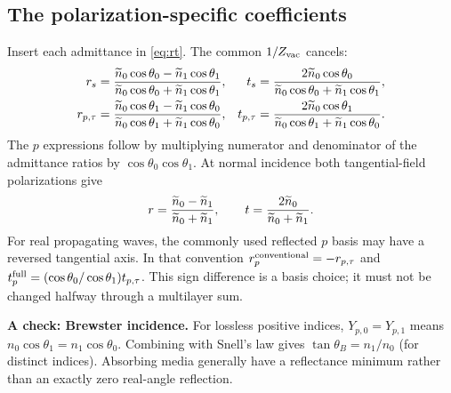 \subsection{The polarization-specific coefficients}
Insert each admittance in \eqref{eq:rt}. The common $1/Z_{\rm vac}$ cancels:
\begin{align}
r_s&=\frac{\widetilde n_0\cos\theta_0-\widetilde n_1\cos\theta_1}
{\widetilde n_0\cos\theta_0+\widetilde n_1\cos\theta_1},&
t_s&=\frac{2\widetilde n_0\cos\theta_0}
{\widetilde n_0\cos\theta_0+\widetilde n_1\cos\theta_1},\\
r_{p,\tau}&=\frac{\widetilde n_0\cos\theta_1-\widetilde n_1\cos\theta_0}
{\widetilde n_0\cos\theta_1+\widetilde n_1\cos\theta_0},&
t_{p,\tau}&=\frac{2\widetilde n_0\cos\theta_1}
{\widetilde n_0\cos\theta_1+\widetilde n_1\cos\theta_0}.
\end{align}
The $p$ expressions follow by multiplying numerator and denominator of the admittance ratios by $\cos\theta_0\cos\theta_1$. At normal incidence both tangential-field polarizations give
\begin{equation}
r=\frac{\widetilde n_0-\widetilde n_1}{\widetilde n_0+\widetilde n_1},\qquad
 t=\frac{2\widetilde n_0}{\widetilde n_0+\widetilde n_1}.
\end{equation}
For real propagating waves, the commonly used reflected $p$ basis may have a reversed tangential axis. In that convention $r_p^{\rm conventional}=-r_{p,\tau}$ and
$t_p^{\rm full}=(\cos\theta_0/\cos\theta_1)t_{p,\tau}$. This sign difference is a basis choice; it must not be changed halfway through a multilayer sum.

\textbf{A check: Brewster incidence.} For lossless positive indices, $Y_{p,0}=Y_{p,1}$ means $n_0\cos\theta_1=n_1\cos\theta_0$. Combining with Snell's law gives $\tan\theta_B=n_1/n_0$ (for distinct indices). Absorbing media generally have a reflectance minimum rather than an exactly zero real-angle reflection.
\clearpage
